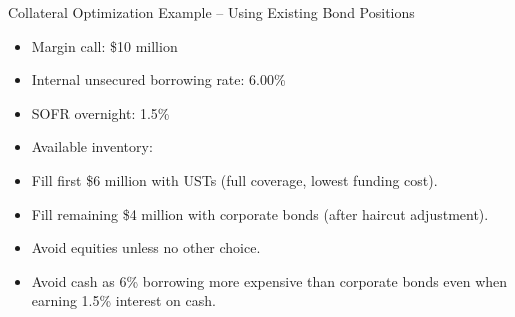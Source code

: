 \documentclass[handout, aspectratio=169]{beamer}
\begin{document}
\begin{frame}{Collateral Optimization Example – Using Existing Bond Positions}
  \begin{itemize}
    \item Margin call: \$10 million
    \item Internal unsecured borrowing rate: 6.00\%
    \item SOFR overnight: 1.5\%
    \item Available inventory:
  \end{itemize}
  \begin{table}[h]
    \centering
  \end{table}
  \vspace{0.1cm}
  \begin{itemize}
    \item Fill first \$6 million with USTs (full coverage, lowest funding cost).
    \item Fill remaining \$4 million with corporate bonds (after haircut adjustment).
    \item Avoid equities unless no other choice.
    \item Avoid cash as 6\% borrowing more expensive than corporate bonds even when earning 1.5\% interest on cash.
  \end{itemize}
\end{frame}


\end{document}
